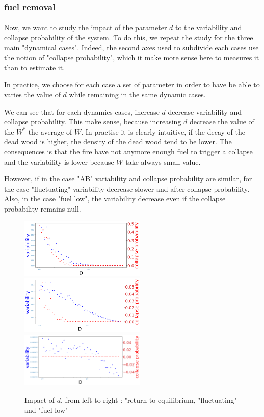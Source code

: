 \documentclass{article}
\begin{document}
\subsubsection{fuel removal}
\label{fuel_removal}
\paragraph{}
Now, we want to study the impact of the parameter $d$ to the variability and collapse probability of the system. To do this, we repeat the study for the three main "dynamical cases". Indeed, the second axes used to subdivide each cases use the notion of "collapse probability", which it make more sense here to measures it than to estimate it. 

In practice, we choose for each case a set of parameter in order to have be able to varies the value of $d$ while remaining in the same dynamic cases.

We can see that for each dynamics cases, increase $d$ decrease variability and collapse probability. This make sense, because increasing $d$ decrease the value of the $W^*$ the average of $W$. In practise it is clearly intuitive, if the decay of the dead wood is higher, the density of the dead wood tend to be lower. The consequences is that the fire have not anymore enough fuel to trigger a collapse and the variability is lower because $W$ take always small value.

However, if in the case "AB" variability and collapse probability are similar, for the case "fluctuating" variability decrease slower and after collapse probability. Also, in the case "fuel low", the variability decrease even if the collapse probability remains null.



\begin{figure}[h]
\begin{center}
\includegraphics[width=6cm]{results/return_to_equilibrium_1.png}
\includegraphics[width=6cm]{results/equivalent_1.png}
\includegraphics[width=6cm]{results/fuel_low_1.png}
\end{center}
\caption{\label{fig:temp}Impact of $d$, from left to right : "return to equilibrium, "fluctuating" and "fuel low"}
\end{figure}
\end{document}
